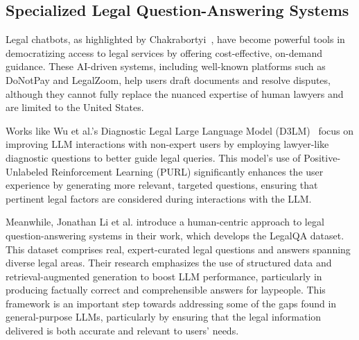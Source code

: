 \subsection{Specialized Legal Question-Answering Systems}
Legal chatbots, as highlighted by Chakrabortyi~\cite{chakraborty2023revolutionizing}, 
have become powerful tools in democratizing access to legal services by 
offering cost-effective, on-demand guidance. These AI-driven systems, 
including well-known platforms such as DoNotPay and LegalZoom, 
help users draft documents and resolve disputes, although they cannot 
fully replace the nuanced expertise of human lawyers and are limited to the United States.

Works like Wu et al.'s Diagnostic Legal Large Language Model 
(D3LM)~\cite{wu2024knowledgeinfusedlegalwisdomnavigating} focus on improving LLM 
interactions with non-expert users by employing lawyer-like diagnostic 
questions to better guide legal queries. This model's use of 
Positive-Unlabeled Reinforcement Learning (PURL) significantly 
enhances the user experience by generating more relevant, targeted questions, 
ensuring that pertinent legal factors are considered during interactions 
with the LLM.

Meanwhile, Jonathan Li et al. \cite{li2024experimentinglegalaisolutions} 
introduce a human-centric approach to legal question-answering systems in 
their work, which develops the LegalQA dataset. This dataset comprises real, 
expert-curated legal questions and answers spanning diverse legal areas. 
Their research emphasizes the use of structured data and retrieval-augmented 
generation to boost LLM performance, particularly in producing factually 
correct and comprehensible answers for laypeople. This framework is an 
important step towards addressing some of the gaps found in general-purpose LLMs, 
particularly by ensuring that the legal information delivered is both accurate and 
relevant to users' needs.

